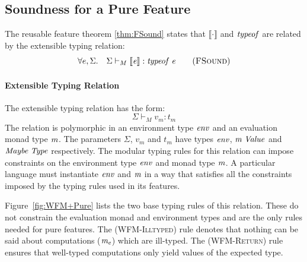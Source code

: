 \subsection{Soundness for a Pure Feature}

\label{sec:Thm+Reuse}

The reusable feature theorem \ref{thm:FSound} states that \ensuremath{\llbracket \cdot \rrbracket} and
\ensuremath{\Varid{typeof}} are related by the extensible typing relation:
\begin{equation}
  \forall e, \Sigma.\quad\Sigma \vdash_M \ensuremath{\llbracket \Varid{e}\rrbracket} : \ensuremath{\Varid{typeof}\;\Varid{e}}
\tag{\textsc{FSound}}
\label{thm:FSound}
\end{equation}

\paragraph{Extensible Typing Relation} The extensible
typing relation has the form: \[ \Sigma \vdash_M v_m : t_m \] The
relation is polymorphic in an environment type \ensuremath{\Varid{env}} and an evaluation
monad type \ensuremath{\Varid{m}}.  The parameters $\Sigma$, $v_m$ and $t_m$ have types
\ensuremath{\Varid{env}}, \ensuremath{\Varid{m}\;\Conid{Value}} and \ensuremath{\Conid{Maybe}\;\Conid{Type}} respectively.
The modular typing rules for this relation can impose constraints on
the environment type \ensuremath{\Varid{env}} and monad type \ensuremath{\Varid{m}}. A particular language must
instantiate \ensuremath{\Varid{env}} and \ensuremath{\Varid{m}} in a way that satisfies all the
constraints imposed by the typing rules used in its features.

Figure~\ref{fig:WFM+Pure} lists the two base typing rules of this
relation. These do not constrain the evaluation monad and environment
types and are the only rules needed for pure features. The
\textsc{(WFM-Illtyped)} rule denotes that nothing can be
said about computations (\ensuremath{\Varid{m}_\Varid{e}}) which are ill-typed.
The \textsc{(WFM-Return)} rule ensures that well-typed computations only
yield values of the expected type.


